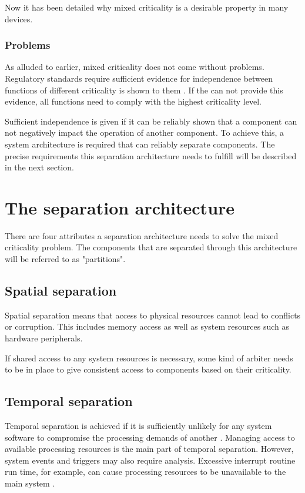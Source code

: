 Now it has been detailed why mixed criticality is a desirable property in many devices. 
\subsubsection{Problems}
As alluded to earlier, mixed criticality does not come without problems. Regulatory standards require sufficient evidence for independence between functions of different criticality is shown to them \cite{IEC.2000-1}\cite{IEC.2000-2}. If the \mfg{} can not provide this evidence, all functions need to comply with the highest criticality level. 

Sufficient independence is given if it can be reliably shown that a component can not negatively impact the operation of another component.
To achieve this, a system architecture is required that can reliably separate components. The precise requirements this separation architecture needs to fulfill will be described in the next section.


\section{The separation architecture} \label{separation-arch}
There are four attributes a separation architecture needs to solve the mixed criticality problem.  The components that are separated through this architecture will be referred to as "partitions".
\subsection{Spatial separation}

Spatial separation means that access to physical resources cannot lead to conflicts or corruption. This includes memory access as well as system resources such as hardware peripherals. \cite{wittenstein2017spatial}\cite{perez2013safety}

If shared access to any system resources is necessary, some kind of arbiter needs to be in place to give consistent access to components based on their criticality. 
\subsection{Temporal separation}
Temporal separation is achieved if it is sufficiently unlikely for any system software to compromise the processing demands of another \cite{wittenstein2017temporal}. 
Managing access to available processing resources is the main part of temporal separation. However, system events and triggers may also require analysis. Excessive interrupt routine run time, for example, can cause processing resources to be unavailable to the main system \cite{wittenstein2017temporal}. 
